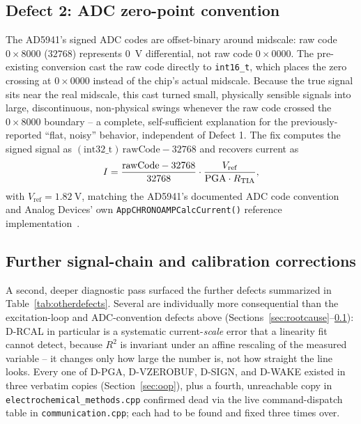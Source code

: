 \subsection{Defect 2: ADC zero-point convention}
\label{sec:adcfix}
The AD5941's signed ADC codes are offset-binary around midscale: raw code
$0{\times}8000$ ($32768$) represents \SI{0}{\volt} differential, not raw
code $0{\times}0000$. The pre-existing conversion cast the raw code
directly to \texttt{int16\_t}, which places the zero crossing at
$0{\times}0000$ instead of the chip's actual midscale. Because the true
signal sits near the real midscale, this cast turned small, physically
sensible signals into large, discontinuous, non-physical swings whenever
the raw code crossed the $0{\times}8000$ boundary -- a complete,
self-sufficient explanation for the previously-reported ``flat, noisy''
behavior, independent of Defect 1. The fix computes the signed signal as
$(\mathrm{int32\_t})\,\mathrm{rawCode} - 32768$ and recovers current as
\begin{equation}
I = \frac{\mathrm{rawCode} - 32768}{32768}\cdot\frac{V_{\mathrm{ref}}}{\mathrm{PGA}\cdot R_{\mathrm{TIA}}},
\label{eq:current}
\end{equation}
with $V_{\mathrm{ref}}=\SI{1.82}{\volt}$, matching the AD5941's documented
ADC code convention and Analog Devices' own
\texttt{AppCHRONOAMPCalcCurrent()} reference
implementation~\cite{ad5940_examples_github}.

\subsection{Further signal-chain and calibration corrections}
\label{sec:otherdefects}
A second, deeper diagnostic pass surfaced the further defects summarized
in Table~\ref{tab:otherdefects}. Several are individually more
consequential than the excitation-loop and ADC-convention defects above
(Sections~\ref{sec:rootcause}--\ref{sec:adcfix}): D-RCAL in particular is a
systematic current-\emph{scale} error that a linearity fit cannot detect,
because $R^2$ is invariant under an affine rescaling of the measured
variable -- it changes only how large the number is, not how straight the
line looks. Every one of D-PGA, D-VZEROBUF, D-SIGN, and D-WAKE existed in
three verbatim copies (Section~\ref{sec:oop}), plus a fourth, unreachable
copy in \texttt{electrochemical\_methods.cpp} confirmed dead via the live
command-dispatch table in \texttt{communication.cpp}; each had to be found
and fixed three times over.

